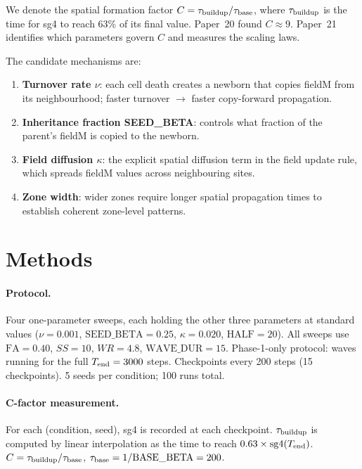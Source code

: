 \documentclass[11pt]{article}
\begin{document}
We denote the spatial formation factor $C = \tau_{\rm buildup}/\tau_{\rm base}$,
where $\tau_{\rm buildup}$ is the time for sg4 to reach 63\% of its final value.
Paper~20 found $C \approx 9$.
Paper~21 identifies which parameters govern $C$ and measures the scaling laws.

The candidate mechanisms are:
\begin{enumerate}
  \item \textbf{Turnover rate $\nu$}: each cell death creates a newborn that copies
    fieldM from its neighbourhood; faster turnover $\to$ faster copy-forward propagation.
  \item \textbf{Inheritance fraction SEED\_BETA}: controls what fraction of the
    parent's fieldM is copied to the newborn.
  \item \textbf{Field diffusion $\kappa$}: the explicit spatial diffusion term in the
    field update rule, which spreads fieldM values across neighbouring sites.
  \item \textbf{Zone width}: wider zones require longer spatial propagation times
    to establish coherent zone-level patterns.
\end{enumerate}

\section{Methods}

\paragraph{Protocol.}
Four one-parameter sweeps, each holding the other three parameters at standard values
($\nu=0.001$, $\mathrm{SEED\_BETA}=0.25$, $\kappa=0.020$, $\mathrm{HALF}=20$).
All sweeps use $\mathrm{FA}=0.40$, $SS=10$, $WR=4.8$, $\mathrm{WAVE\_DUR}=15$.
Phase-1-only protocol: waves running for the full $T_{\rm end} = 3000$ steps.
Checkpoints every 200 steps (15 checkpoints). 5 seeds per condition; 100 runs total.

\paragraph{C-factor measurement.}
For each (condition, seed), sg4 is recorded at each checkpoint.
$\tau_{\rm buildup}$ is computed by linear interpolation as the time to reach
$0.63 \times \mathrm{sg4}(T_{\rm end})$.
$C = \tau_{\rm buildup}/\tau_{\rm base}$, $\tau_{\rm base} = 1/\mathrm{BASE\_BETA} = 200$.
\end{document}
